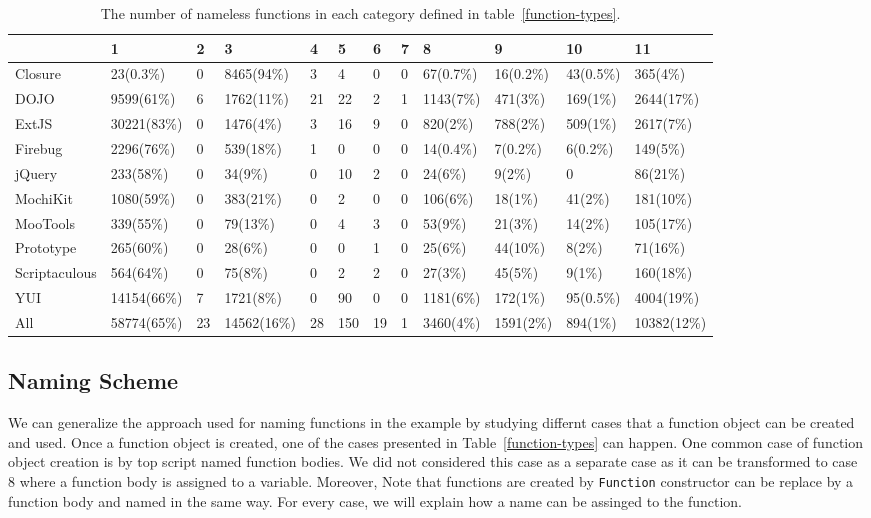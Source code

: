 \documentclass{acm_proc_article-sp}
\begin{document}
\begin{table}
\centering
\caption{The number of nameless functions in each category defined in table~\ref{function-types}.}
  \begin{tabular}{ | l | l | l | l | l | l | l | l | l | l | l | l |}
  \hline
     & 1 & 2 & 3 & 4 & 5 & 6 & 7 & 8 & 9 & 10 & 11 \\ 
  \hline 
   Closure       & 23(0.3\%)  & 0  & 8465(94\%) & 3  & 4  & 0  & 0 & 67(0.7\%)& 16(0.2\%)& 43(0.5\%)& 365(4\%)\\ 
  \hline 
   DOJO          & 9599(61\%) & 6  & 1762(11\%) & 21 & 22 & 2  & 1 & 1143(7\%)& 471(3\%) & 169(1\%) & 2644(17\%) \\ 
  \hline 
   ExtJS         & 30221(83\%)& 0  & 1476(4\%)  & 3  & 16 & 9  & 0 & 820(2\%) & 788(2\%) & 509(1\%) & 2617(7\%) \\ 
  \hline 
   Firebug       & 2296(76\%) & 0  & 539(18\%)  & 1  & 0  & 0  & 0 & 14(0.4\%)& 7(0.2\%) & 6(0.2\%) & 149(5\%) \\ 
  \hline 
   jQuery        & 233(58\%)  & 0  & 34(9\%)    & 0  & 10 & 2  & 0 & 24(6\%)  & 9(2\%)   & 0        & 86(21\%)  \\ 
  \hline 
   MochiKit      & 1080(59\%) & 0  & 383(21\%)  & 0  & 2  & 0  & 0 & 106(6\%) & 18(1\%)  & 41(2\%)  & 181(10\%) \\ 
  \hline 
   MooTools      & 339(55\%)  & 0  & 79(13\%)   & 0  & 4  & 3  & 0 & 53(9\%)  & 21(3\%)  & 14(2\%)  & 105(17\%) \\ 
  \hline 
   Prototype     & 265(60\%)  & 0  & 28(6\%)    & 0  & 0  & 1  & 0 & 25(6\%)  & 44(10\%) & 8(2\%)   & 71(16\%) \\ 
  \hline 
   Scriptaculous & 564(64\%)  & 0  & 75(8\%)    & 0  & 2  & 2  & 0 & 27(3\%)  & 45(5\%)  & 9(1\%)   & 160(18\%) \\ 
  \hline 
   YUI           & 14154(66\%)& 7  & 1721(8\%)  & 0  & 90 & 0  & 0 & 1181(6\%)& 172(1\%) & 95(0.5\%)& 4004(19\%)\\ 
  \hline 
   All           & 58774(65\%)& 23 & 14562(16\%)& 28 & 150& 19 & 1 & 3460(4\%)& 1591(2\%)& 894(1\%) & 10382(12\%) \\ 
  \hline 
  \end{tabular}
 \label{function-types-count} 
\end{table}    

\subsection{Naming Scheme}
We can generalize the approach used for naming functions in the example by studying differnt cases that a function object can be created and used. Once a function object is created, one of the cases presented in Table~\ref{function-types} can happen. One common case of function object creation is by top script named function bodies. We did not considered this case as a separate case as it can be transformed to case 8 where a function body is assigned to a variable. Moreover, Note that functions are created by {\small\texttt{Function}} constructor can be replace by a function body and named in the same way. For every case, we will explain how a name can be assinged to the function.
\end{document}
